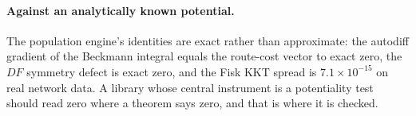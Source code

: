 \paragraph{Against an analytically known potential.} The population engine's
identities are exact rather than approximate: the autodiff gradient of the
Beckmann integral equals the route-cost vector to exact zero, the $DF$ symmetry
defect is exact zero, and the Fisk KKT spread is $7.1\times10^{-15}$ on real
network data. A library whose central instrument is a potentiality test should
read zero where a theorem says zero, and that is where it is checked.

